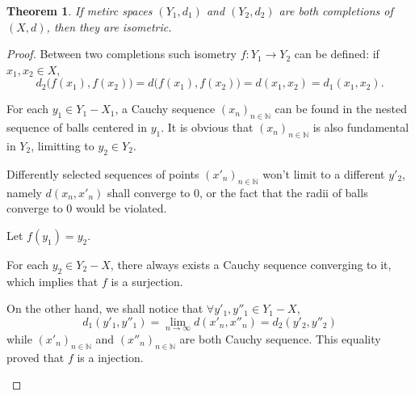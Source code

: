 \documentclass[openany]{book}
\theoremstyle{plain}
\newtheorem{theorem}{Theorem}[section] %
\theoremstyle{definition}
\begin{document}
\begin{theorem}\label{theorem: completion is unique}
	If metirc spaces $(Y_1, d_1)$ and $(Y_2, d_2)$ are both completions of $(X, d)$, then they are isometric.
\end{theorem}
\begin{proof}
	Between two completions such isometry $f \colon Y_1 \to Y_2$ can be defined: if $x_1, x_2 \in X$, 
	\[
		d_2 \big(f(x_1), f(x_2) \big)
		= d \big(f(x_1), f(x_2) \big) 
		= d(x_1, x_2)
		= d_1 (x_1, x_2).
	\]

	For each $y_1 \in Y_1 - X_1$, a Cauchy sequence $(x_n)_{n \in \mathbb N}$ can be found in the nested sequence of balls centered in $y_1$. 
	It is obvious that $(x_n)_{n \in \mathbb N}$ is also fundamental in $Y_2$, limitting to $y_2\in Y_2$. 
	
	Differently selected sequences of points $(x'_n)_{n \in \mathbb N}$ won't limit to a different $y'_2$, namely $d(x_n, x'_n)$ shall converge to $0$, or the fact that the radii of balls converge to $0$ would be violated. 
	
	Let $f(y_1) = y_2$. 

	\begin{conditionlist}[label=\alph*)]
		\item
		For each $y_2 \in Y_2 - X$, there always exists a Cauchy sequence converging to it, which implies that $f$ is a surjection.
		\item
		On the other hand, we shall notice that $\forall y'_1, y''_1 \in Y_1 - X$,
		\[
			d_1(y'_1, y''_1)= \lim_{n \to \infty} d(x'_n, x''_n)=d_2(y'_2, y''_2)
		\]
		while $(x'_n)_{n \in \mathbb N}$ and $(x''_n)_{n \in \mathbb N}$ are both Cauchy sequence. 
		This equality proved that $f$ is a injection.
	\end{conditionlist}
\end{proof}
\end{document}

